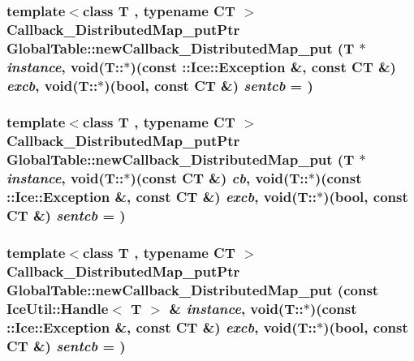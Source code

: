 \label{namespace_global_table_a315f9a738ac5bb0e7e62e036d6982743}
\hypertarget{namespace_global_table_ab934b8c9e3f65a8f374cc9be304887c0}{
\subsubsection[{newCallback\_\-DistributedMap\_\-put}]{\setlength{\rightskip}{0pt plus 5cm}template$<$class T , typename CT $>$ {\bf Callback\_\-DistributedMap\_\-putPtr} GlobalTable::newCallback\_\-DistributedMap\_\-put (T $\ast$ {\em instance}, \/  void(T::$\ast$)(const ::Ice::Exception \&, const CT \&) {\em excb}, \/  void(T::$\ast$)(bool, const CT \&) {\em sentcb} = {})}}
\label{namespace_global_table_ab934b8c9e3f65a8f374cc9be304887c0}
\hypertarget{namespace_global_table_a9e758916c769de44951344a42de701d4}{
\subsubsection[{newCallback\_\-DistributedMap\_\-put}]{\setlength{\rightskip}{0pt plus 5cm}template$<$class T , typename CT $>$ {\bf Callback\_\-DistributedMap\_\-putPtr} GlobalTable::newCallback\_\-DistributedMap\_\-put (T $\ast$ {\em instance}, \/  void(T::$\ast$)(const CT \&) {\em cb}, \/  void(T::$\ast$)(const ::Ice::Exception \&, const CT \&) {\em excb}, \/  void(T::$\ast$)(bool, const CT \&) {\em sentcb} = {})}}
\label{namespace_global_table_a9e758916c769de44951344a42de701d4}
\hypertarget{namespace_global_table_a1b764a4b02bf17c9bc7c012febad04db}{
\subsubsection[{newCallback\_\-DistributedMap\_\-put}]{\setlength{\rightskip}{0pt plus 5cm}template$<$class T , typename CT $>$ {\bf Callback\_\-DistributedMap\_\-putPtr} GlobalTable::newCallback\_\-DistributedMap\_\-put (const IceUtil::Handle$<$ T $>$ \& {\em instance}, \/  void(T::$\ast$)(const ::Ice::Exception \&, const CT \&) {\em excb}, \/  void(T::$\ast$)(bool, const CT \&) {\em sentcb} = {})}}
